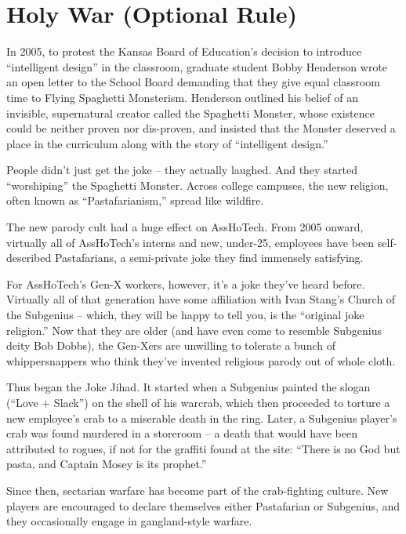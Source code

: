 \documentclass[a4paper,10pt]{article}
\begin{document}
\section*{Holy War (Optional Rule)}
\label{sec:HolyWar(OptionalRule)}

In 2005, to protest the Kansas Board of Education's decision to introduce ``intelligent design'' in the classroom, graduate student Bobby Henderson wrote an open letter to the School Board demanding that they give equal classroom time to Flying Spaghetti Monsterism. Henderson outlined his belief of an invisible, supernatural creator called the Spaghetti Monster, whose existence could be neither proven nor dis-proven, and insisted that the Monster deserved a place in the curriculum along with the story of ``intelligent design.''

People didn't just get the joke -- they actually laughed. And they started ``worshiping'' the Spaghetti Monster. Across college campuses, the new religion, often known as ``Pastafarianism,'' spread like wildfire.

The new parody cult had a huge effect on AssHoTech. From 2005 onward, virtually all of AssHoTech's interns and new, under-25, employees have been self-described Pastafarians, a semi-private joke they find immensely satisfying.

For AssHoTech's Gen-X workers, however, it's a joke they've heard before. Virtually all of that generation have some affiliation with Ivan Stang's Church of the Subgenius -- which, they will be happy to tell you, is the ``original joke religion.'' Now that they are older (and have even come to resemble Subgenius deity Bob Dobbs), the Gen-Xers are unwilling to tolerate a bunch of whippersnappers who think they've invented religious parody out of whole cloth.

Thus began the Joke Jihad. It started when a Subgenius painted the slogan (``Love + Slack'') on the shell of his warcrab, which then proceeded to torture a new employee's crab to a miserable death in the ring. Later, a Subgenius player's crab was found murdered in a storeroom -- a death that would have been attributed to rogues, if not for the graffiti found at the site: ``There is no God but pasta, and Captain Mosey is its prophet.''

Since then, sectarian warfare has become part of the crab-fighting culture. New players are encouraged to declare themselves either Pastafarian or Subgenius, and they occasionally engage in gangland-style warfare.
\end{document}
